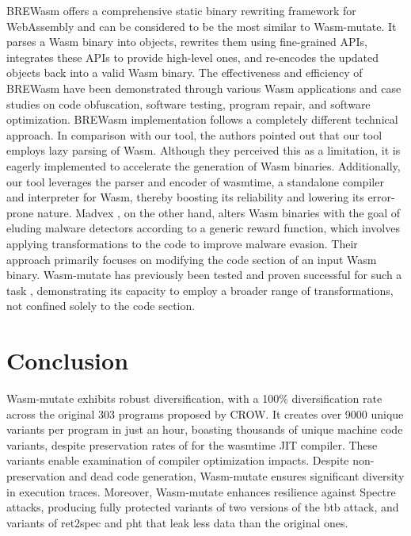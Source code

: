 \documentclass[sigplan,screen]{acmart}
\newcommand*\badge[1]{ \colorbox{red}{\color{white}#1}}
\newcommand{\tool}{Wasm-mutate\xspace}
\newcommand{\wasm}{Wasm\xspace}
\newcommand{\Wasm}{WebAssembly\xspace}
\newcommand{\todo}[1]{%
\refstepcounter{todo}
\noindent\textbf{\badge{TODO}} {\color{red}#1}
\addcontentsline{td}{todo}
{\color{red}\thesection.\thetodo\xspace #1}}
\begin{document}
BREWasm \cite{rewritingtool2023} offers a comprehensive static binary rewriting framework for \Wasm and can be considered to be the most similar to \tool. 
It parses a Wasm binary into objects, rewrites them using fine-grained APIs, integrates these APIs to provide high-level ones, and re-encodes the updated objects back into a valid Wasm binary. 
The effectiveness and efficiency of BREWasm have been demonstrated through various Wasm applications and case studies on code obfuscation, software testing, program repair, and software optimization. 
BREWasm implementation follows a completely different technical approach.
In comparison with our tool, the authors pointed out that our tool employs lazy parsing of Wasm. 
Although they perceived this as a limitation, it is eagerly implemented to accelerate the generation of \wasm binaries.
Additionally, our tool leverages the parser and encoder of wasmtime, a standalone compiler and interpreter for Wasm, thereby boosting its reliability and lowering its error-prone nature.
Madvex \cite{madvex}, on the other hand, alters Wasm binaries with the goal of eluding malware detectors according to a generic reward function, which involves applying transformations to the code to improve malware evasion. 
Their approach primarily focuses on modifying the code section of an input Wasm binary. 
\tool has previously been tested and proven successful for such a task \cite{CABRERAARTEAGA2023103296}, demonstrating its capacity to employ a broader range of transformations, not confined solely to the code section.





\section{Conclusion}
\label{conc}


\tool exhibits robust diversification, with a 100\% diversification rate across the original 303 programs proposed by CROW. 
It creates over 9000 unique variants per program in just an hour, boasting thousands of unique machine code variants, despite preservation rates of \preserved for the wasmtime JIT compiler. 
These variants enable examination of compiler optimization impacts.
Despite non-preservation and dead code generation, \tool ensures significant diversity in execution traces. 
Moreover, \tool enhances resilience against Spectre attacks, producing fully protected variants of two versions of the btb attack, and variants of ret2spec and pht that leak less data than the original ones.
\end{document}
